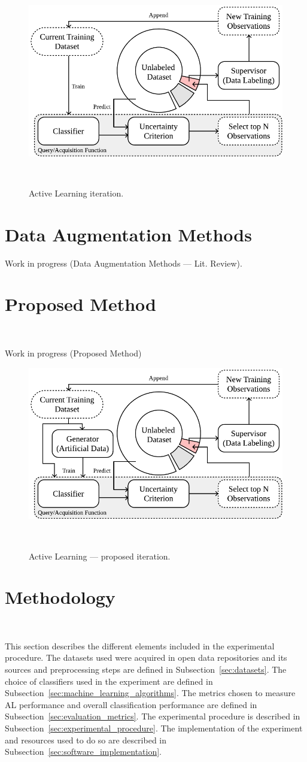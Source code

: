 \documentclass[parskip=full]{scrartcl}
\begin{document}
\begin{figure}[H]
	\centering
	\includegraphics[width=.65\linewidth]{../analysis/al_iteration}
    \caption{%
        Active Learning iteration.
    }~\label{fig:al_iteration}
\end{figure}

\section{Data Augmentation Methods}

Work in progress (Data Augmentation Methods --- Lit. Review).

\section{Proposed Method}~\label{sec:proposed_method}

Work in progress (Proposed Method)

\begin{figure}[H]
	\centering
	\includegraphics[width=.65\linewidth]{../analysis/al_proposed}
    \caption{%
        Active Learning --- proposed iteration.
    }~\label{fig:al_proposed}
\end{figure}


\section{Methodology}~\label{sec:methodology}

This section describes the different elements included in the experimental
procedure. The datasets used were acquired in open data repositories and its
sources and preprocessing steps are defined in Subsection~\ref{sec:datasets}.
The choice of classifiers used in the experiment are defined in
Subsection~\ref{sec:machine_learning_algorithms}. The metrics chosen to
measure AL performance and overall classification performance are defined in
Subsection~\ref{sec:evaluation_metrics}. The experimental procedure is
described in Subsection~\ref{sec:experimental_procedure}. The implementation
of the experiment and resources used to do so are described in
Subsection~\ref{sec:software_implementation}.
\end{document}
